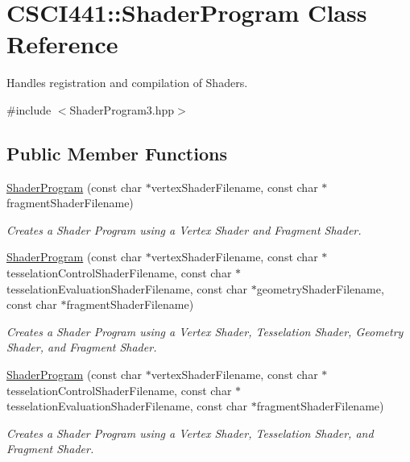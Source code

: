 \hypertarget{class_c_s_c_i441_1_1_shader_program}{}\section{C\+S\+C\+I441\+:\+:Shader\+Program Class Reference}
\label{class_c_s_c_i441_1_1_shader_program}


Handles registration and compilation of Shaders.  




{\ttfamily \#include $<$Shader\+Program3.\+hpp$>$}

\subsection*{Public Member Functions}
\begin{DoxyCompactItemize}
\item 
\hyperlink{class_c_s_c_i441_1_1_shader_program_a0f51bed7fb1b24075b96be6c7a490f8d}{Shader\+Program} (const char $\ast$vertex\+Shader\+Filename, const char $\ast$fragment\+Shader\+Filename)
\begin{DoxyCompactList}\small\item\em Creates a Shader Program using a Vertex Shader and Fragment Shader. \end{DoxyCompactList}\item 
\hyperlink{class_c_s_c_i441_1_1_shader_program_af561da1984872a47dba91e30a5aec14d}{Shader\+Program} (const char $\ast$vertex\+Shader\+Filename, const char $\ast$tesselation\+Control\+Shader\+Filename, const char $\ast$tesselation\+Evaluation\+Shader\+Filename, const char $\ast$geometry\+Shader\+Filename, const char $\ast$fragment\+Shader\+Filename)
\begin{DoxyCompactList}\small\item\em Creates a Shader Program using a Vertex Shader, Tesselation Shader, Geometry Shader, and Fragment Shader. \end{DoxyCompactList}\item 
\hyperlink{class_c_s_c_i441_1_1_shader_program_afd18599e84cde305494daa39dc751fd1}{Shader\+Program} (const char $\ast$vertex\+Shader\+Filename, const char $\ast$tesselation\+Control\+Shader\+Filename, const char $\ast$tesselation\+Evaluation\+Shader\+Filename, const char $\ast$fragment\+Shader\+Filename)
\begin{DoxyCompactList}\small\item\em Creates a Shader Program using a Vertex Shader, Tesselation Shader, and Fragment Shader. \end{DoxyCompactList}\item 

\end{DoxyCompactItemize}
